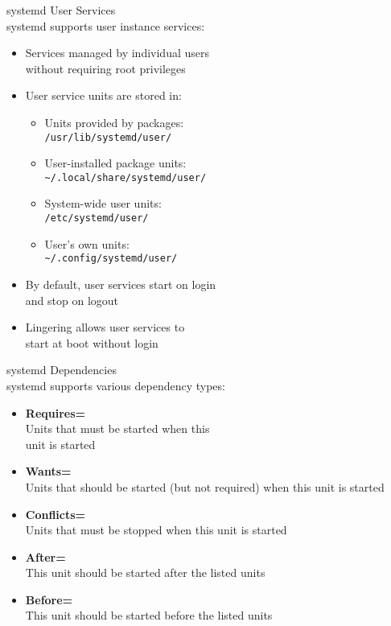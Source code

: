\begin{definition}{systemd User Services}\\
    systemd supports user instance services:
    \begin{itemize}
        \item Services managed by individual users \\ without requiring root privileges
        \item User service units are stored in:
            \begin{itemize}
                \item Units provided by packages: \\ \texttt{/usr/lib/systemd/user/}
                \item User-installed package units: \\ \texttt{\textasciitilde/.local/share/systemd/user/}
                \item System-wide user units: \\ \texttt{/etc/systemd/user/}
                \item User's own units: \\ \texttt{\textasciitilde/.config/systemd/user/}
            \end{itemize}
        \item By default, user services start on login \\ and stop on logout
        \item Lingering allows user services to \\ start at boot without login
    \end{itemize}
\end{definition}

\begin{definition}{systemd Dependencies}\\
    systemd supports various dependency types:
    \begin{itemize}
        \item \textbf{Requires=} \\ Units that must be started when this \\ unit is started
        \item \textbf{Wants=} \\ Units that should be started (but not required) when this unit is started
        \item \textbf{Conflicts=} \\ Units that must be stopped when this unit is started
        \item \textbf{After=} \\ This unit should be started after the listed units
        \item \textbf{Before=} \\ This unit should be started before the listed units
    \end{itemize}
\end{definition}

